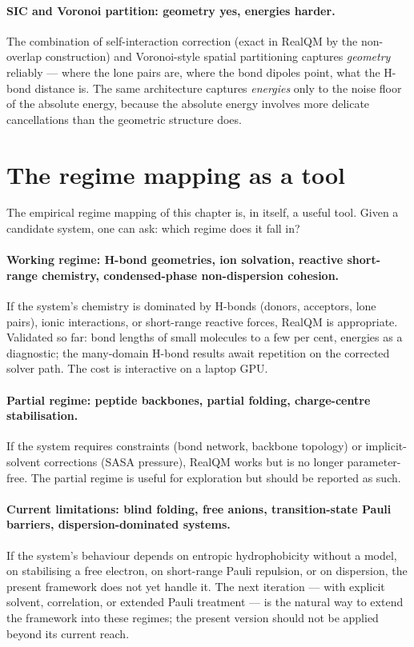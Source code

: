 \paragraph{SIC and Voronoi partition: geometry yes, energies harder.}
The combination of self-interaction correction (exact in RealQM by the non-overlap construction) and Voronoi-style spatial partitioning captures \emph{geometry} reliably --- where the lone pairs are, where the bond dipoles point, what the H-bond distance is. The same architecture captures \emph{energies} only to the noise floor of the absolute energy, because the absolute energy involves more delicate cancellations than the geometric structure does.

\section{The regime mapping as a tool}\label{sec:regime-tool}

The empirical regime mapping of this chapter is, in itself, a useful tool. Given a candidate system, one can ask: which regime does it fall in?

\paragraph{Working regime: H-bond geometries, ion solvation, reactive short-range chemistry, condensed-phase non-dispersion cohesion.}
If the system's chemistry is dominated by H-bonds (donors, acceptors, lone pairs), ionic interactions, or short-range reactive forces, RealQM is appropriate. Validated so far: bond lengths of small molecules to a few per cent, energies as a diagnostic; the many-domain H-bond results await repetition on the corrected solver path. The cost is interactive on a laptop GPU.

\paragraph{Partial regime: peptide backbones, partial folding, charge-centre stabilisation.}
If the system requires constraints (bond network, backbone topology) or implicit-solvent corrections (SASA pressure), RealQM works but is no longer parameter-free. The partial regime is useful for exploration but should be reported as such.

\paragraph{Current limitations: blind folding, free anions, transition-state Pauli barriers, dispersion-dominated systems.}
If the system's behaviour depends on entropic hydrophobicity without a model, on stabilising a free electron, on short-range Pauli repulsion, or on dispersion, the present framework does not yet handle it. The next iteration --- with explicit solvent, correlation, or extended Pauli treatment --- is the natural way to extend the framework into these regimes; the present version should not be applied beyond its current reach.

